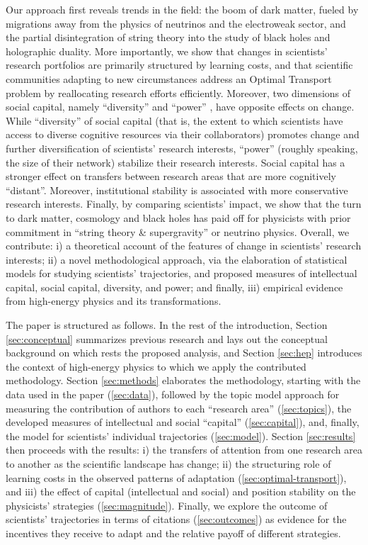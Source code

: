 \documentclass{article}
\begin{document}
Our approach first reveals trends in the field: the boom of dark matter, fueled by migrations away from the physics of neutrinos and the electroweak sector, and the partial disintegration of string theory into the study of black holes and holographic duality. More importantly, we show that changes in scientists' research portfolios are primarily structured by learning costs, and that scientific communities adapting to new circumstances address an Optimal Transport problem by reallocating research efforts efficiently. Moreover, two dimensions of social capital, namely ``diversity'' and ``power'' \citep{Abbasi2014}, have opposite effects on change. While ``diversity'' of social capital (that is, the extent to which scientists have access to diverse cognitive resources via their collaborators) promotes change and further diversification of scientists' research interests, ``power'' (roughly speaking, the size of their network) stabilize their research interests. Social capital has a stronger effect on transfers between research areas that are more cognitively ``distant''. Moreover, institutional stability is associated with more conservative research interests. Finally, by comparing scientists' impact, we show that the turn to dark matter, cosmology and black holes has paid off for physicists with prior commitment in ``string theory \& supergravity'' or neutrino physics.
Overall, we contribute: i) a theoretical account of the features of change in scientists' research interests; ii) a novel methodological approach, via the elaboration of statistical models for studying scientists' trajectories, and proposed measures of intellectual capital, social capital, diversity, and power; and finally, iii) empirical evidence from high-energy physics and its transformations.

The paper is structured as follows. In the rest of the introduction, Section \ref{sec:conceptual} summarizes previous research and lays out the conceptual background on which rests the proposed analysis, and Section \ref{sec:hep} introduces the context of high-energy physics to which we apply the contributed methodology. %
Section \ref{sec:methods} elaborates the methodology, starting with the data used in the paper (\ref{sec:data}), followed by the topic model approach for measuring the contribution of authors to each ``research area'' (\ref{sec:topics}), the developed measures of intellectual and social ``capital'' (\ref{sec:capital}), and, finally, the model for scientists' individual trajectories (\ref{sec:model}).
Section \ref{sec:results} then proceeds with the results: i) the transfers of attention from one research area to another as the scientific landscape has change; ii) the structuring role of learning costs in the observed patterns of adaptation (\ref{sec:optimal-transport}), and iii) the effect of capital (intellectual and social) and position stability on the physicists' strategies (\ref{sec:magnitude}). Finally, we explore the outcome of scientists' trajectories in terms of citations (\ref{sec:outcomes}) as evidence for the incentives they receive to adapt and the relative payoff of different strategies. 
\end{document}
